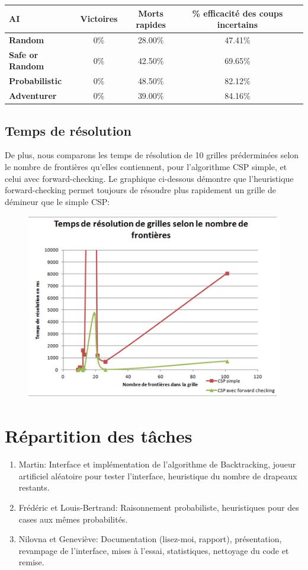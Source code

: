 \documentclass{article}
\begin{document}
\begin{tabular}{| l | c | c | c | c | }
        \hline
	\textbf{AI} & \textbf{Victoires} & \textbf{Morts rapides} & \textbf{\% efficacité des coups incertains} \\
        \hline
	\textbf{Random} & 0\% & 28.00\% & 47.41\% \\
        \hline
	\textbf{Safe or Random} & 0\% & 42.50\% & 69.65\% \\
        \hline
	\textbf{Probabilistic} & 0\% & 48.50\% & 82.12\% \\
        \hline
	\textbf{Adventurer} & 0\% & 39.00\% & 84.16\% \\
        \hline
\end{tabular}

\subsection{Temps de résolution}
De plus, nous comparons les temps de résolution de 10 grilles préderminées selon le nombre de 
frontières qu’elles contiennent, pour l’algorithme CSP simple, et celui avec forward-checking.
Le graphique ci-dessous démontre que l’heuristique forward-checking permet toujours de 
résoudre plus rapidement un grille de démineur que le simple CSP:

\begin{figure}[h!]
  \centering
  \includegraphics[scale=.5]{./vitesse.png}
\end{figure}

\section{Répartition des tâches}
\begin{enumerate}
        \item Martin: Interface et implémentation de l’algorithme de Backtracking, joueur artificiel aléatoire pour tester 
              l’interface, heuristique du nombre de drapeaux restants.
        \item Frédéric et Louis-Bertrand: Raisonnement probabiliste, heuristiques pour des cases aux mêmes probabilités.
        \item Nilovna et Geneviève: Documentation (lisez-moi, rapport), présentation, 
              revampage de l’interface, mises à l’essai, statistiques, nettoyage du code et remise.
\end{enumerate}
\end{document}
